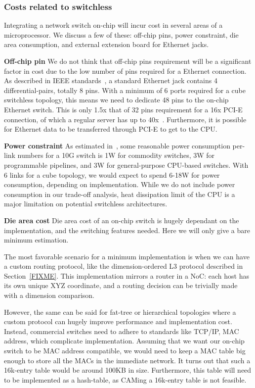 \subsubsection{Costs related to switchless}
Integrating a network switch on-chip will incur cost in several areas of a microprocessor. We discuss a few of these: off-chip pins, power constraint, die area consumption, and external extension board for Ethernet jacks.

\newcommand{\subsubsubsection}{\textbf}
\subsubsubsection{Off-chip pin}
We do not think that off-chip pins requirement will be a significant factor in cost due to the low number of pins required for a Ethernet connection. As described in IEEE standards~\cite{eithercitation?}, a standard Ethernet jack contains 4 differential-pairs, totally 8 pins. With a minimum of 6 ports required for a cube switchless topology, this means we need to dedicate 48 pins to the on-chip Ethernet switch. This is only 1.5x that of 32 pins requirement for a 16x PCI-E connection, of which a regular server has up to 40x~\cite{https://www-ssl.intel.com/content/www/us/en/processors/xeon/xeon-e5-v2-datasheet-vol-1.htmlFIXME}. Furthermore, it is possible for Ethernet data to be transferred through PCI-E to get to the CPU.

\subsubsubsection{Power constraint}
As estimated in~\cite{cheap_silicon}, some reasonable power consumption per-link numbers for a 10G switch is 1W for commodity switches, 3W for programmable pipelines, and 3W for general-purpose CPU-based switches. With 6 links for a cube topology, we would expect to spend 6-18W for power consumption, depending on implementation. While we do not include power consumption in our trade-off analysis, heat dissipation limit of the CPU is a major limitation on potential switchless architectures.

\subsubsubsection{Die area cost}
Die area cost of an on-chip switch is hugely dependant on the implementation, and the switching features needed. Here we will only give a bare minimum estimation.

The most favorable scenario for a minimum implementation is when we can have a custom routing protocol, like the dimension-ordered L3 protocol described in Section~\ref{FIXME}. This implementation mirrors a router in a NoC: each host has its own unique XYZ coordinate, and a routing decision can be trivially made with a dimension comparison.

However, the same can be said for fat-tree or hierarchical topologies where a custom protocol can hugely improve performance and implementation cost. Instead, commercial switches need to adhere to standards like TCP/IP, MAC address, which complicate implementation. Assuming that we want our on-chip switch to be MAC address compatible, we would need to keep a MAC table big enough to store all the MACs in the immediate network. It turns out that such a 16k-entry table would be around 100KB in size. Furthermore, this table will need to be implemented as a hash-table, as CAMing a 16k-entry table is not feasible.

